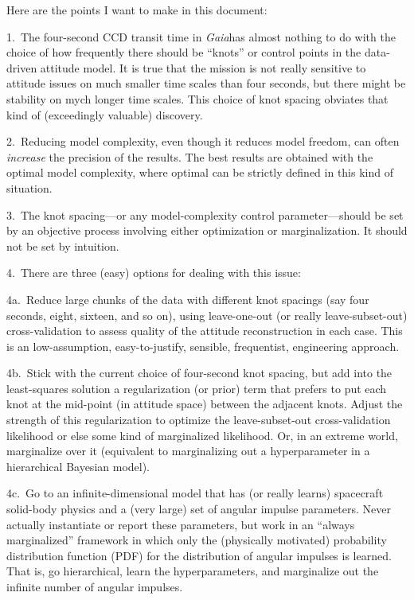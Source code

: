 \documentclass[12pt]{article}
\newcommand{\project}[1]{\textsl{#1}}
\newcommand{\gaia}{\project{Gaia}}
\begin{document}
Here are the points I want to make in this document:

1.~The four-second CCD transit time in \gaia has almost nothing to do
with the choice of how frequently there should be ``knots'' or control
points in the data-driven attitude model.  It is true that the mission
is not really sensitive to attitude issues on much smaller time scales
than four seconds, but there might be stability on mych longer time
scales.  This choice of knot spacing obviates that kind of
(exceedingly valuable) discovery.

2.~Reducing model complexity, even though it reduces model freedom,
can often \emph{increase} the precision of the results.  The best
results are obtained with the optimal model complexity, where optimal
can be strictly defined in this kind of situation.

3.~The knot spacing---or any model-complexity control
parameter---should be set by an objective process involving either
optimization or marginalization.  It should not be set by intuition.

4.~There are three (easy) options for dealing with this issue:

4a.~Reduce large chunks of the data with different knot spacings (say
four seconds, eight, sixteen, and so on), using leave-one-out (or
really leave-subset-out) cross-validation to assess quality of the
attitude reconstruction in each case.  This is an low-assumption,
easy-to-justify, sensible, frequentist, engineering approach.

4b.~Stick with the current choice of four-second knot spacing, but add
into the least-squares solution a regularization (or prior) term that
prefers to put each knot at the mid-point (in attitude space) between
the adjacent knots.  Adjust the strength of this regularization to
optimize the leave-subset-out cross-validation likelihood or else some
kind of marginalized likelihood.  Or, in an extreme world, marginalize
over it (equivalent to marginalizing out a hyperparameter in a
hierarchical Bayesian model).

4c.~Go to an infinite-dimensional model that has (or really learns)
spacecraft solid-body physics and a (very large) set of angular
impulse parameters.  Never actually instantiate or report these
parameters, but work in an ``always marginalized'' framework in which
only the (physically motivated) probability distribution function
(PDF) for the distribution of angular impulses is learned.  That is,
go hierarchical, learn the hyperparameters, and marginalize out the
infinite number of angular impulses.
\end{document}
